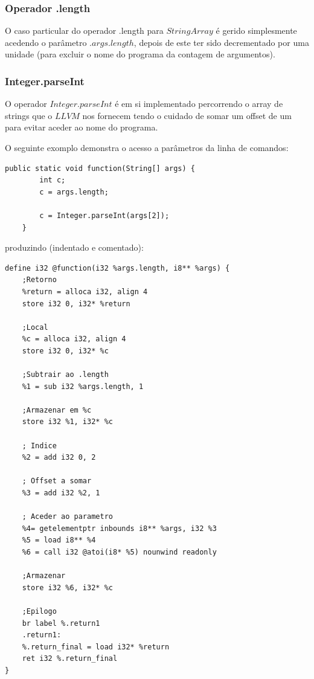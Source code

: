 \documentclass[11pt,a4paper]{article}
\begin{document}
\subsubsection{Operador .length}
O caso particular do operador .length para $StringArray$ é gerido simplesmente acedendo o parâmetro $.args.length$, depois de este ter sido decrementado por uma unidade (para excluir o nome do programa da contagem de argumentos).

\subsubsection{Integer.parseInt}

O operador $Integer.parseInt$ é em si implementado percorrendo o array de strings que o $LLVM$ nos fornecem tendo o cuidado de somar um offset de um para evitar aceder ao nome do programa.

O seguinte exomplo demonstra o acesso a parâmetros da linha de comandos:

\begin{lstlisting}
public static void function(String[] args) {
        int c;
        c = args.length;

        c = Integer.parseInt(args[2]);
    }
\end{lstlisting}

produzindo (indentado e comentado):

\begin{lstlisting}
define i32 @function(i32 %args.length, i8** %args) {
    ;Retorno
    %return = alloca i32, align 4
    store i32 0, i32* %return

    ;Local
    %c = alloca i32, align 4
    store i32 0, i32* %c

    ;Subtrair ao .length
    %1 = sub i32 %args.length, 1

    ;Armazenar em %c
    store i32 %1, i32* %c

    ; Indice
    %2 = add i32 0, 2

    ; Offset a somar
    %3 = add i32 %2, 1

    ; Aceder ao parametro
    %4= getelementptr inbounds i8** %args, i32 %3
    %5 = load i8** %4
    %6 = call i32 @atoi(i8* %5) nounwind readonly

    ;Armazenar
    store i32 %6, i32* %c

    ;Epilogo
    br label %.return1
    .return1:
    %.return_final = load i32* %return
    ret i32 %.return_final
}
\end{lstlisting}
\end{document}

